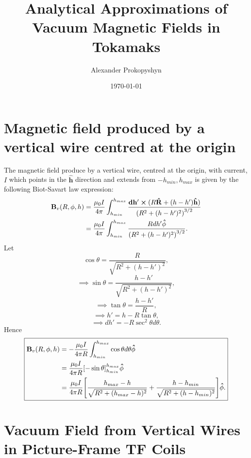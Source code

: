\documentclass{article}
\title{Analytical Approximations of Vacuum Magnetic Fields in Tokamaks}
\author{Alexander Prokopyshyn}
\date{\today}
\let\vec\mathbf
\begin{document}
\maketitle

\section{Magnetic field produced by a vertical wire centred at the origin}

The magnetic field produce by a vertical wire, centred at the origin, with current, \(I\) which points in the 
\(\vec{\hat{h}}\) direction and extends from \(-h_{min}, h_{max}\) is given by the following Biot-Savart law expression:
\[\begin{aligned}
    \vec{B}_{v}(R, \phi, h) &= \frac{\mu_0 I}{4\pi}\int_{h_{min}}^{h_{max}}\frac{\vec{dh'}\cross(R\vec{\hat{R}} + (h-h')\vec{\hat{h}})}{\qty(R^2+(h-h')^2)^{3/2}} \\
    &= \frac{\mu_0 I}{4\pi}\int_{h_{min}}^{h_{max}}\frac{Rdh'\vec{\hat{\phi}}}{\qty(R^2+(h-h')^2)^{3/2}}.
\end{aligned}
\]
Let
\[\cos\theta = \frac{R}{\sqrt{R^2+(h-h')^2}},\]
\[\implies \sin\theta = \frac{h-h'}{\sqrt{R^2+(h-h')^2}},\]
\[\implies \tan \theta = \frac{h-h'}{R},\]
\[\implies h' = h - R\tan\theta,\]
\[\implies dh' = -R\sec^2\theta d\theta.\]
Hence
\[
\boxed{\begin{aligned}
    \vec{B}_{v}(R, \phi, h) &= -\frac{\mu_0 I}{4\pi R}\int_{h_{min}}^{h_{max}}\cos\theta d\theta\vec{\hat{\phi}}\\
    &= \frac{\mu_0 I}{4\pi R}\qty[-\sin\theta]_{h_{min}}^{h_{max}}\vec{\hat{\phi}}\\
    &= \frac{\mu_0 I}{4\pi R}\qty[\frac{h_{max}-h}{\sqrt{R^2+(h_{max}-h)^2}} + \frac{h-h_{min}}{\sqrt{R^2+(h-h_{min})^2}}]\vec{\hat{\phi}}.
\end{aligned}}\]

\section{Vacuum Field from Vertical Wires in Picture-Frame TF Coils}
\end{document}
